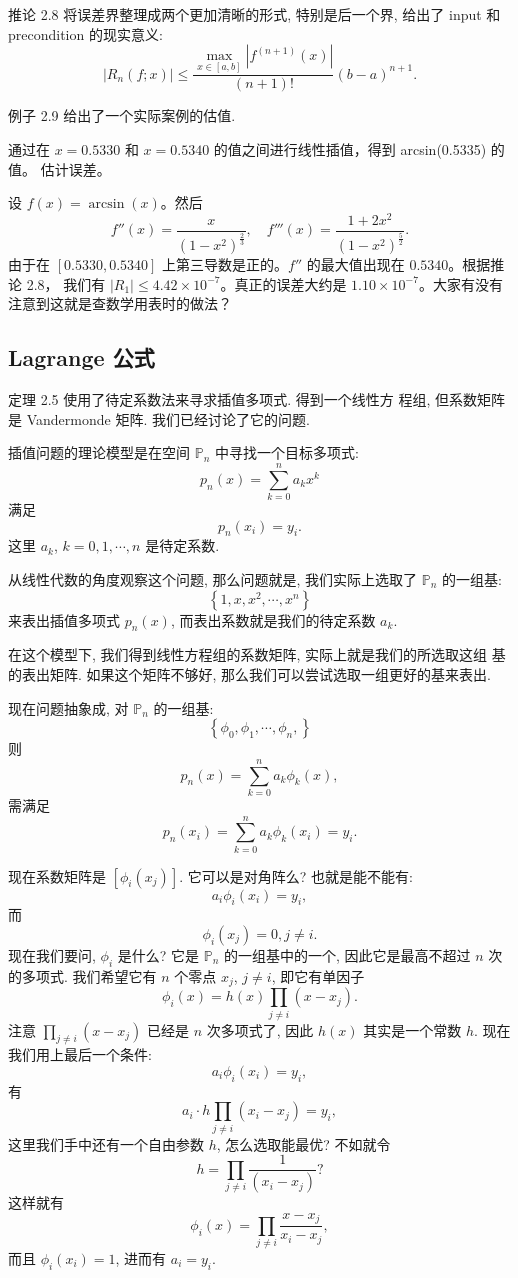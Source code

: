 \documentclass[a4paper]{ctexart}
\newcommand{\remark}[1]
{\noindent {\bf Remark {#1}}}
\begin{document}
推论 2.8 将误差界整理成两个更加清晰的形式, 特别是后一个界, 给出了
input 和 precondition 的现实意义:
$$
|R_n(f; x)| \leq
\frac{\max_{x \in [a, b]}\left|f^{(n + 1)}(x)\right|}{(n + 1)!}(b - a)^{n + 1}.
$$

例子 2.9 给出了一个实际案例的估值.

 通过在 $x = 0.5330$ 和 $x = 0.5340$ 的值之间进行线性插值，得到 arcsin(0.5335) 的值。
估计误差。

设 $f (x) = \arcsin(x)$。然后
\[
f'' (x) = \frac{x}{(1 - x^2)^{\frac{2}{3}}}, \quad f''' (x) = \frac{1 + 2x^2}{(1 - x^2)^{\frac{5}{2}}}.
\]
由于在 $[0.5330, 0.5340]$ 上第三导数是正的。$f''$ 的最大值出现在 $0.5340$。根据推论 2.8，
我们有 $|R_1| \leq 4.42 \times 10^{-7}$。真正的误差大约是 $1.10 \times 10^{-7}$。大家有没有注意到这就是查数学用表时的做法？

\subsection{Lagrange 公式}
\remark{2.5} 定理 2.5 使用了待定系数法来寻求插值多项式. 得到一个线性方
程组, 但系数矩阵是 Vandermonde 矩阵. 我们已经讨论了它的问题.

插值问题的理论模型是在空间 $\mathbb{P}_n$ 中寻找一个目标多项式:
$$
p_n(x) = \sum_{k = 0}^n a_k x^k
$$
满足
$$
p_n(x_i) = y_i.
$$
这里 $a_k$, $k = 0, 1, \cdots, n$ 是待定系数.

从线性代数的角度观察这个问题, 那么问题就是, 我们实际上选取了
$\mathbb{P}_n$ 的一组基:
$$
\left\{1, x, x^2, \cdots, x^n\right\}
$$
来表出插值多项式 $p_n(x)$, 而表出系数就是我们的待定系数 $a_k$.

在这个模型下, 我们得到线性方程组的系数矩阵, 实际上就是我们的所选取这组
基的表出矩阵. 如果这个矩阵不够好, 那么我们可以尝试选取一组更好的基来表出.

现在问题抽象成, 对 $\mathbb{P}_n$ 的一组基:
$$
\left\{
\phi_0, \phi_1, \cdots, \phi_n,
\right\}
$$
则
$$
p_n(x) = \sum_{k = 0}^n a_k \phi_k(x),
$$
需满足
$$
p_n(x_i) = \sum_{k = 0}^n a_k \phi_k(x_i) = y_i.
$$

现在系数矩阵是 $\left[\phi_i(x_j)\right]$. 它可以是对角阵么? 也就是能不能有:
$$
a_i\phi_i(x_i) = y_i,
$$
而
$$
\phi_i(x_j) = 0, j \neq i.
$$
现在我们要问, $\phi_i$ 是什么? 它是 $\mathbb{P}_n$ 的一组基中的一个,
因此它是最高不超过 $n$ 次的多项式. 我们希望它有 $n$ 个零点 $x_j$, $j \neq i$,
即它有单因子
$$
\phi_i(x) = h(x) \prod_{j \neq i}(x - x_j).
$$
注意 $\prod_{j \neq i}(x - x_j)$ 已经是 $n$ 次多项式了, 因此 $h(x)$
其实是一个常数 $h$. 现在我们用上最后一个条件:
$$
a_i\phi_i(x_i) = y_i,
$$
有
$$
a_i \cdot h \prod_{j \neq i}(x_i - x_j) = y_i,
$$
这里我们手中还有一个自由参数 $h$, 怎么选取能最优? 
不如就令
$$
h = \prod_{j \neq i}\frac{1}{(x_i - x_j)} ?
$$
这样就有
$$
\phi_i(x) = \prod_{j \neq i}\frac{x - x_j}{x_i - x_j}, 
$$
而且 $\phi_i(x_i) = 1$, 进而有 $a_i = y_i$.
\end{document}
